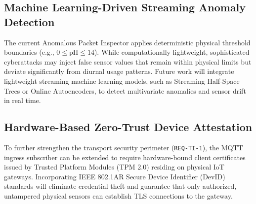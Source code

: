 \subsection{Machine Learning-Driven Streaming Anomaly Detection}
The current Anomalous Packet Inspector applies deterministic physical threshold boundaries (e.g., $0 \le \text{pH} \le 14$). While computationally lightweight, sophisticated cyberattacks may inject false sensor values that remain within physical limits but deviate significantly from diurnal usage patterns. Future work will integrate lightweight streaming machine learning models, such as Streaming Half-Space Trees or Online Autoencoders, to detect multivariate anomalies and sensor drift in real time.

\subsection{Hardware-Based Zero-Trust Device Attestation}
To further strengthen the transport security perimeter (\texttt{REQ-TI-1}), the MQTT ingress subscriber can be extended to require hardware-bound client certificates issued by Trusted Platform Modules (TPM 2.0) residing on physical IoT gateways. Incorporating IEEE 802.1AR Secure Device Identifier (DevID) standards will eliminate credential theft and guarantee that only authorized, untampered physical sensors can establish TLS connections to the gateway.
